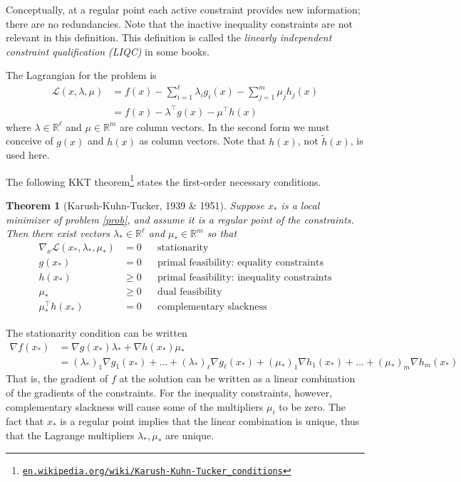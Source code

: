 \documentclass[11pt]{amsart}
\newtheorem*{thm}{Theorem}
\theoremstyle{definition}
\newcommand{\RR}{\mathbb{R}}
\newcommand{\grad}{\nabla}
\begin{document}
\noindent Conceptually, at a regular point each active constraint provides new information; there are no redundancies.  Note that the inactive inequality constraints are not relevant in this definition.  This definition is called the \emph{linearly independent constraint qualification (LIQC)} in some books.

The Lagrangian for the problem is
\begin{align*}
\mathcal{L}(x,\lambda,\mu) &= f(x) - \sum_{i=1}^\ell \lambda_i g_i(x) - \sum_{j=1}^m \mu_j h_j(x) \\
  &= f(x) - \lambda^\top g(x) - \mu^\top h(x)
\end{align*}
where $\lambda\in\RR^\ell$ and $\mu\in\RR^m$ are column vectors.  In the second form we must conceive of $g(x)$ and $h(x)$ as column vectors.  Note that $h(x)$, not $\tilde h(x)$, is used here.

The following KKT theorem\footnote{\href{https://en.wikipedia.org/wiki/Karush-Kuhn-Tucker_conditions}{\texttt{en.wikipedia.org/wiki/Karush-Kuhn-Tucker\_conditions}}} states the first-order necessary conditions.

\begin{thm}[Karush-Kuhn-Tucker, 1939 \& 1951]  Suppose $x_*$ is a local minimizer of problem \eqref{prob}, and assume it is a regular point of the constraints.  Then there exist vectors $\lambda_*\in\RR^\ell$ and $\mu_*\in\RR^m$ so that
\begin{align*}
\grad_x \mathcal{L}(x_*,\lambda_*,\mu_*) &= 0 &&\text{stationarity} \\
g(x_*) &= 0  &&\text{primal feasibility: equality constraints} \\
h(x_*) &\ge 0  &&\text{primal feasibility: inequality constraints} \\
\mu_* &\ge 0 &&\text{dual feasibility} \\
\mu_*^\top h(x_*) &= 0 &&\text{complementary slackness}
\end{align*}
\end{thm}

\medskip
\noindent The stationarity condition can be written
\begin{align*}
\grad f(x_*) &= \grad g(x_*) \lambda_* + \grad h(x_*) \mu_* \\
  &= (\lambda_*)_1 \grad g_1(x_*) + \dots + (\lambda_*)_\ell \grad g_\ell(x_*) + (\mu_*)_1 \grad h_1(x_*) + \dots + (\mu_*)_m \grad h_m(x_*)
\end{align*}
That is, the gradient of $f$ at the solution can be written as a linear combination of the gradients of the constraints.  For the inequality constraints, however, complementary slackness will cause some of the multipliers $\mu_i$ to be zero.  The fact that $x_*$ is a regular point implies that the linear combination is unique, thus that the Lagrange multipliers $\lambda_*,\mu_*$ are unique.
\end{document}
